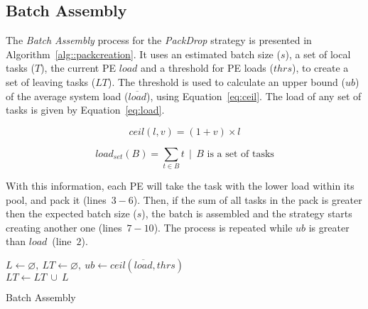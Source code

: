 \subsection{Batch Assembly} \label{sec:algo:creation}

The \textit{Batch Assembly} process for the \textit{PackDrop} strategy is presented in Algorithm~\ref{alg::packcreation}.
It uses an estimated batch size ($s$), a set of local tasks ($T$), the current PE $load$ and a threshold for PE loads ($thrs$), to create a set of leaving tasks ($LT$).
The threshold is used to calculate an upper bound ($ub$) of the average system load ($\overline{load}$), using Equation~\ref{eq:ceil}. 
The load of any set of tasks is given by Equation~\ref{eq:load}.

\begin{equation}
	ceil(l,v) = (1+v)\times l
    \label{eq:ceil}
\end{equation}

\begin{equation}
	load_{set}(B) = \sum_{t \in B}t\ \ |\ \ B \text{ is a set of tasks}
	\label{eq:load}
\end{equation}

With this information, each PE will take the task with the lower load within its pool, and pack it (lines~$3-6$).
Then, if the sum of all tasks in the pack is greater then the expected batch size ($s$), the batch is assembled and the strategy starts creating another one (lines~$7-10$).
The process is repeated while $ub$ is greater than $load$~(line~$2$).

\begin{algorithm}[!ht]
    \DontPrintSemicolon
    $L \gets \varnothing,\ LT \gets \varnothing,\ ub \gets ceil(\overline{load},thrs)$ \\
    $LT \gets LT\ \cup\ L$   
    \caption{Batch Assembly} 
    \label{alg::packcreation}
\end{algorithm}


